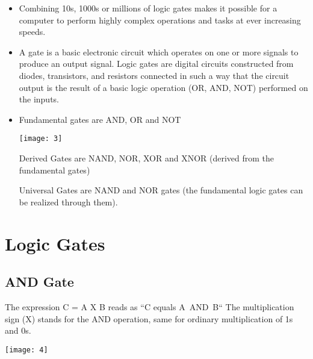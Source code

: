 \documentclass{article}
\begin{document}
\begin{itemize}
		\item Combining 10s, 1000s or millions of logic gates makes it possible for a computer to perform highly complex operations and tasks at ever increasing speeds. \\
		
		\item A gate is a basic electronic circuit which operates on one or more signals to produce an output signal. 
		Logic gates are digital circuits constructed from diodes, transistors, and resistors connected in such a way that the circuit output is the result of a basic logic operation (OR, AND, NOT) performed on the inputs. \\
		
		\item Fundamental gates are \color{red}AND, OR \color{black}and \color{red}NOT \\
		\begin{center}
			\texttt{[image: 3]}
		\end{center}
		
		\color{black}Derived Gates are \color{red}NAND, NOR, XOR \color{black}and \color{red}XNOR \color{black}(derived from the fundamental gates)
		
		Universal Gates are \color{red}NAND \color{black} and \color{red}NOR \color{black}gates (the fundamental logic gates can be realized through them).
		
		
	\end{itemize}
\section{Logic Gates}

\subsection{AND Gate}
The expression C = A X B reads as “C equals A AND B“ 
The multiplication sign (X) stands for the AND operation, same for ordinary multiplication of 1s and 0s.\\
\begin{center}
	\texttt{[image: 4]}
\end{center}
\end{document}
